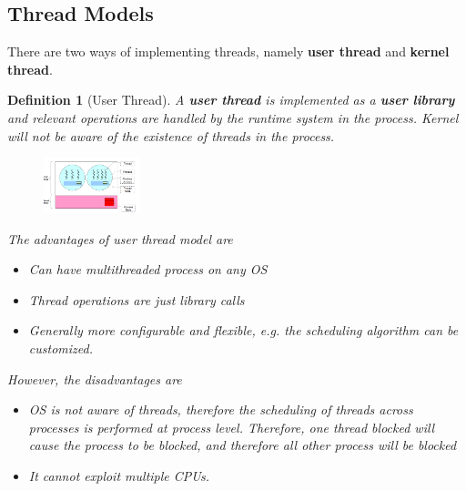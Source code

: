 \documentclass[11pt]{article}
\newtheorem{definition}{Definition}[section]
\theoremstyle{definition}
\begin{document}
\subsection{Thread Models}
There are two ways of implementing threads, namely \textbf{user thread} and \textbf{kernel thread}.
\begin{definition}[User Thread]
A \textbf{user thread} is implemented as a \textbf{user library} and relevant operations are handled by the runtime system in the process. Kernel will not be aware of the existence of threads in the process.
\begin{figure}[h]
\centering
\includegraphics[width=0.25\textwidth]{4_1.png}
\end{figure}
The advantages of user thread model are
\begin{itemize}[itemsep=0pt]
  \item Can have multithreaded process on \textit{any} OS
  \item Thread operations are just library calls
  \item Generally more configurable and flexible, e.g. the scheduling algorithm can be customized.
\end{itemize}
However, the disadvantages are
\begin{itemize}[itemsep=0pt]
  \item OS is not aware of threads, therefore the scheduling of threads across processes is performed at process level. Therefore, one thread blocked will cause the process to be blocked, and therefore all other process will be blocked
  \item It cannot exploit multiple CPUs.
\end{itemize}
\end{definition}
\end{document}
